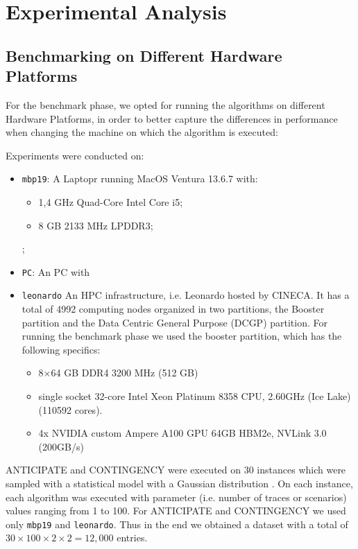 \documentclass[a4paper,singleside,12pt]{report} %
\begin{document}
\chapter{Experimental Analysis}

\section{Benchmarking on Different Hardware Platforms}

For the benchmark phase, we opted for running the algorithms on different Hardware Platforms, in order to better capture the differences in performance
when changing the machine on which the algorithm is executed:

Experiments were conducted on:
\begin{itemize}
\item \verb|mbp19|: A Laptopr running MacOS Ventura 13.6.7 with:
    \begin{itemize}
        \item 1,4 GHz Quad-Core Intel Core i5;
        \item 8 GB 2133 MHz LPDDR3;
    \end{itemize};
\item \verb|PC|: An PC with 
\item \verb|leonardo| An HPC infrastructure, i.e. Leonardo hosted by CINECA. It has a total of 4992 computing nodes organized in two partitions, the Booster partition and the Data Centric General Purpose (DCGP) partition. For running the benchmark phase we used the booster partition, which has the following specifics:
    \begin{itemize}
        \item 8×64 GB DDR4 3200 MHz (512 GB)
        \item single socket 32-core Intel Xeon Platinum 8358 CPU, 2.60GHz (Ice Lake) (110592 cores).
        \item 4x NVIDIA custom Ampere A100 GPU 64GB HBM2e, NVLink 3.0 (200GB/s)
    \end{itemize}
\end{itemize}

ANTICIPATE and CONTINGENCY were executed on 30 instances which were sampled with a statistical model with a Gaussian distribution \cite{DEFILIPPO2022109199}.
On each instance, each algorithm was executed with parameter (i.e. number of traces or scenarios) values ranging from 1 to 100. For ANTICIPATE and CONTINGENCY we
used only \verb|mbp19| and \verb|leonardo|. Thus in the end we obtained a dataset with a total of $30 \times 100 \times 2 \times 2 = 12,000$ entries.
\end{document}
